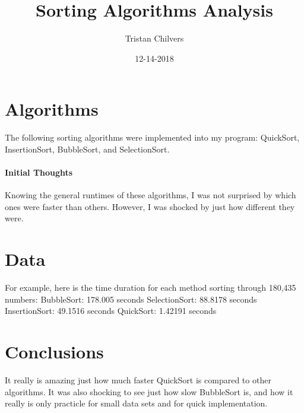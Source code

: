 \documentclass{article}
\title{Sorting Algorithms Analysis}
\date{12-14-2018}
\author{Tristan Chilvers}
\begin{document}
  \maketitle
  \newpage

\section{Algorithms}
  The following sorting algorithms were implemented into my program: 
	\newline QuickSort, InsertionSort, BubbleSort, and SelectionSort. 

\paragraph{Initial Thoughts}
	Knowing the general runtimes of these algorithms, I was not surprised by which ones were faster than others. However, I was shocked by just how different they were. \newline

\section{Data}
For example, here is the time duration for each method sorting through 180,435 numbers:\newline \newline
	BubbleSort:		178.005 seconds\newline
	SelectionSort:	88.8178 seconds\newline
	InsertionSort:	49.1516 seconds\newline
	QuickSort:			1.42191 seconds\newline

\section{Conclusions}
It really is amazing just how much faster QuickSort is compared to other algorithms. It was also shocking to see just how slow BubbleSort is, and how it really is only practicle for small data sets and for quick implementation.
\end{document}

